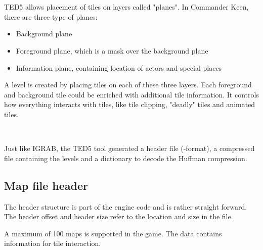 \documentclass[book.tex]{subfiles}
\begin{document}
 
 \par
 \\
 \par
{}\\
 
 \par
TED5 allows placement of tiles on layers called "planes". In Commander Keen, there are three type of planes:
\begin{itemize}
  \item Background plane
  \item Foreground plane, which is a mask over the background plane
  \item Information plane, containing location of actors and special places
\end{itemize}
A level is created by placing tiles on each of these three layers. Each foreground and background tile could be enriched with additional tile information. It controls how everything interacts with tiles, like tile clipping, "deadly" tiles and animated tiles. \\

 \par
{}\\
 
 \par

Just like IGRAB, the TED5 tool generated a header file (-format), a compressed  file containing the levels and a dictionary to decode the Huffman compression. \\
 
\subsection{Map file header}
The header structure is part of the engine code and is rather straight forward. The header offset and header size refer to the location and size in the  file. \\

\par
\begin{minipage}{\textwidth}
 \par
 \end{minipage}

A maximum of 100 maps is supported in the game. The  data contains information for tile interaction. 
\end{document}
